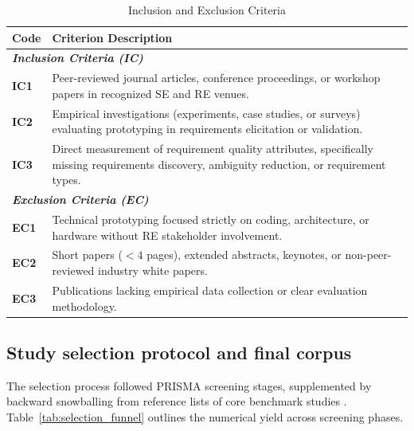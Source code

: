 \begin{table}[htbp]
\centering
\caption{Inclusion and Exclusion Criteria}
\label{tab:inclusion_exclusion}
\begin{tabularx}{\columnwidth}{l X}
\toprule
\textbf{Code} & \textbf{Criterion Description} \\
\midrule
\multicolumn{2}{l}{\textit{\textbf{Inclusion Criteria (IC)}}} \\
\textbf{IC1} & Peer-reviewed journal articles, conference proceedings, or workshop papers in recognized SE and RE venues. \\
\textbf{IC2} & Empirical investigations (experiments, case studies, or surveys) evaluating prototyping in requirements elicitation or validation. \\
\textbf{IC3} & Direct measurement of requirement quality attributes, specifically missing requirements discovery, ambiguity reduction, or requirement types. \\
\midrule
\multicolumn{2}{l}{\textit{\textbf{Exclusion Criteria (EC)}}} \\
\textbf{EC1} & Technical prototyping focused strictly on coding, architecture, or hardware without RE stakeholder involvement. \\
\textbf{EC2} & Short papers ($< 4$ pages), extended abstracts, keynotes, or non-peer-reviewed industry white papers. \\
\textbf{EC3} & Publications lacking empirical data collection or clear evaluation methodology. \\
\bottomrule
\end{tabularx}
\end{table}

\subsection{Study selection protocol and final corpus}
The selection process followed PRISMA screening stages, supplemented by backward snowballing from reference lists of core benchmark studies \cite{lim2008anatomy, berry2003contract, inayat2015systematic}. Table~\ref{tab:selection_funnel} outlines the numerical yield across screening phases.

